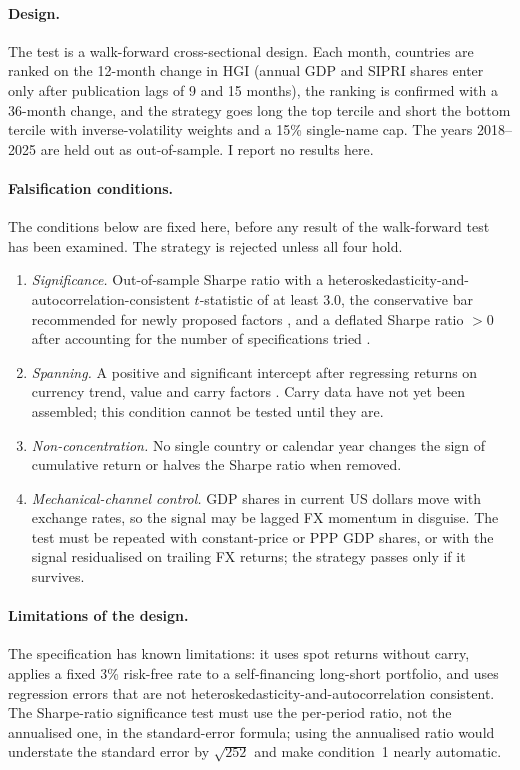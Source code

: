 \documentclass[11pt,letterpaper]{article}
\theoremstyle{definition}
\theoremstyle{plain}
\begin{document}
\paragraph{Design.} The test is a walk-forward cross-sectional design. Each month, countries are ranked on the 12-month change in HGI (annual GDP and SIPRI shares enter only after publication lags of 9 and 15 months), the ranking is confirmed with a 36-month change, and the strategy goes long the top tercile and short the bottom tercile with inverse-volatility weights and a 15\% single-name cap. The years 2018--2025 are held out as out-of-sample. I report no results here.

\paragraph{Falsification conditions.} The conditions below are fixed here, before any result of the walk-forward test has been examined. The strategy is rejected unless all four hold.
\begin{enumerate}[leftmargin=1.5em,itemsep=1pt]
\item \emph{Significance.} Out-of-sample Sharpe ratio with a heteroskedasticity-and-autocorrelation-consistent $t$-statistic of at least 3.0, the conservative bar recommended for newly proposed factors \citep{harvey2016}, and a deflated Sharpe ratio $>0$ after accounting for the number of specifications tried \citep{bailey2014}.
\item \emph{Spanning.} A positive and significant intercept after regressing returns on currency trend, value and carry factors \citep{menkhoff2012,asness2013,lustig2011}. Carry data have not yet been assembled; this condition cannot be tested until they are.
\item \emph{Non-concentration.} No single country or calendar year changes the sign of cumulative return or halves the Sharpe ratio when removed.
\item \emph{Mechanical-channel control.} GDP shares in current US dollars move with exchange rates, so the signal may be lagged FX momentum in disguise. The test must be repeated with constant-price or PPP GDP shares, or with the signal residualised on trailing FX returns; the strategy passes only if it survives.
\end{enumerate}

\paragraph{Limitations of the design.} The specification has known limitations: it uses spot returns without carry, applies a fixed 3\% risk-free rate to a self-financing long-short portfolio, and uses regression errors that are not heteroskedasticity-and-autocorrelation consistent. The Sharpe-ratio significance test must use the per-period ratio, not the annualised one, in the standard-error formula; using the annualised ratio would understate the standard error by $\sqrt{252}$ and make condition~1 nearly automatic.
\end{document}
